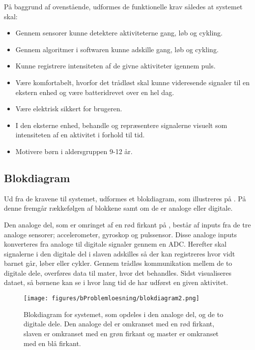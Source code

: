 På baggrund af ovenstående, udformes de funktionelle krav således at systemet skal: 
\begin{itemize}
	\item Gennem sensorer kunne detektere aktiviteterne gang, løb og cykling.
	\item Gennem algoritmer i softwaren kunne adskille gang, løb og cykling.
	\item Kunne registrere intensiteten af de givne aktiviteter igennem puls.
	\item Være komfortabelt, hvorfor det trådløst skal kunne videresende signaler til en ekstern enhed og være batteridrevet over en hel dag.
	\item Være elektrisk sikkert for brugeren.
	\item I den eksterne enhed, behandle og repræsentere signalerne visuelt som intensiteten af en aktivitet i forhold til tid.
	\item Motivere børn i aldersgruppen 9-12 år. 
\end{itemize}

\subsection{Blokdiagram}
Ud fra de kravene til systemet, udformes et blokdiagram, som illustreres på . På denne fremgår rækkefølgen af blokkene samt om de er analoge eller digitale. 

Den analoge del, som er omringet af en rød firkant på , består af inputs fra de tre analoge sensorer; accelerometer, gyroskop og pulssensor. Disse analoge inputs konverteres fra analoge til digitale signaler gennem en ADC. Herefter skal signalerne i den digitale del i slaven adskilles så der kan registreres hvor vidt barnet går, løber eller cykler. Gennem trådløs kommunikation mellem de to digitale dele, overføres data til mater, hvor det behandles. Sidst visualiseres dataet, så børnene kan se i hvor lang tid de har udførst en given aktivitet.  

 \begin{figure}[H]
 	\centering
 	\texttt{[image: figures/bProblemloesning/blokdiagram2.png]}
 	\caption{Blokdiagram for systemet, som opdeles i den analoge del, og de to digitale dele. Den analoge del er omkranset med en rød firkant, slaven er omkranset med en grøn firkant og master er omkranset med en blå firkant.}
 	\label{fig:blokdiagram}
 \end{figure}
